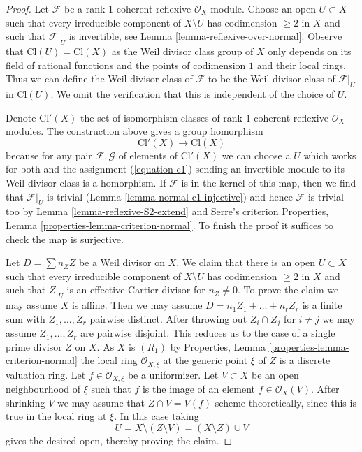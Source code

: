 \begin{proof}
Let $\mathcal{F}$ be a rank $1$ coherent reflexive $\mathcal{O}_X$-module.
Choose an open $U \subset X$ such that
every irreducible component of $X \setminus U$ has codimension $\geq 2$
in $X$ and such that $\mathcal{F}|_U$ is invertible, see
Lemma \ref{lemma-reflexive-over-normal}.
Observe that $\text{Cl}(U) = \text{Cl}(X)$
as the Weil divisor class group of $X$ only depends on
its field of rational functions and the points of
codimension $1$ and their local rings.
Thus we can define the Weil divisor class of $\mathcal{F}$
to be the Weil divisor class of $\mathcal{F}|_U$
in $\text{Cl}(U)$. We omit the verification that this
is independent of the choice of $U$.

\medskip\noindent
Denote $\text{Cl}'(X)$ the set of isomorphism classes of
rank $1$ coherent reflexive $\mathcal{O}_X$-modules. The
construction above gives a group homorphism
$$
\text{Cl}'(X) \longrightarrow \text{Cl}(X)
$$
because for any pair $\mathcal{F}, \mathcal{G}$ of elements
of $\text{Cl}'(X)$ we can choose a $U$ which works for both
and the assignment (\ref{equation-c1}) sending an invertible
module to its Weil divisor class is a homorphism.
If $\mathcal{F}$ is in the kernel of this map, then we find that
$\mathcal{F}|_U$ is trivial (Lemma \ref{lemma-normal-c1-injective})
and hence $\mathcal{F}$ is trivial too by
Lemma \ref{lemma-reflexive-S2-extend} and Serre's criterion
Properties, Lemma \ref{properties-lemma-criterion-normal}.
To finish the proof it suffices to check the map is surjective.

\medskip\noindent
Let $D = \sum n_Z Z$ be a Weil divisor on $X$.
We claim that there is an open $U \subset X$ such that
every irreducible component of $X \setminus U$ has codimension $\geq 2$
in $X$ and such that $Z|_U$ is an effective Cartier divisor
for $n_Z \not = 0$. To prove the claim we may assume $X$ is affine.
Then we may assume $D = n_1 Z_1 + \ldots + n_r Z_r$ is a finite sum
with $Z_1, \ldots, Z_r$ pairwise distinct. After throwing out
$Z_i \cap Z_j$ for $i \not = j$ we may assume $Z_1, \ldots, Z_r$
are pairwise disjoint. This reduces us to the case of a single
prime divisor $Z$ on $X$. As $X$ is $(R_1)$ by
Properties, Lemma \ref{properties-lemma-criterion-normal}
the local ring
$\mathcal{O}_{X, \xi}$ at the generic point $\xi$ of $Z$ is a discrete
valuation ring. Let $f \in \mathcal{O}_{X, \xi}$ be a uniformizer.
Let $V \subset X$ be an open neighbourhood of $\xi$ such that
$f$ is the image of an element $f \in \mathcal{O}_X(V)$.
After shrinking $V$ we may assume that $Z \cap V = V(f)$
scheme theoretically, since this is true in the local ring
at $\xi$. In this case taking
$$
U = X \setminus (Z \setminus V) = (X \setminus Z) \cup V
$$
gives the desired open, thereby proving the claim.


\end{proof}
